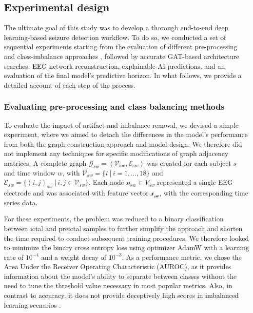 \documentclass[a4paper,fleqn]{cas-sc}
\begin{document}
\subsection{Experimental design}
\label{section:experiment_desing}
The ultimate goal of this study was to develop a thorough end-to-end deep learning-based seizure detection workflow. To do so, we conducted a set of sequential experiments starting from the evaluation of different pre-processing and class-imbalance approaches \cite{mazurek2023preprocessing}, followed by accurate GAT-based architecture searches, EEG network reconstruction, explainable AI predictions, and an evaluation of the final model's predictive horizon. In what follows, we provide a detailed account of each step of the process.

\subsubsection{Evaluating pre-processing and class balancing methods}
To evaluate the impact of artifact and imbalance removal, we devised a simple experiment, where we aimed to detach the differences in the model's performance from both the graph construction approach and model design. We therefore did not implement any techniques for specific modifications of graph adjacency matrices. A complete graph $\mathcal{G}_{sw} = (\mathcal{V}_{sw},\mathcal{E}_{sw})$ was created for each subject $s$ and time window $w$, with $\mathcal{V}_{sw} = \{i \ | \ i=1,\ldots,18\}$ and $\mathcal{E}_{sw} = \{(i,j)_{sw} \ | \ i,j \in \mathcal{V}_{sw}\}$. Each node $\mathcal{n}_{sw} \in V_{sw}$ represented a single EEG electrode and was associated with feature vector $\mathcal{x_{sw}}$, with the corresponding time series data. 

For these experiments, the problem was reduced to a binary classification between ictal and preictal samples to further simplify the approach and shorten the time required to conduct subsequent training procedures. We therefore looked to minimize the binary cross entropy loss using optimizer AdamW \cite{LoshchilovAdam} with a learning rate of $10^{-4}$ and a weight decay of $10^{-3}$. As a performance metric, we chose the Area Under the Receiver Operating Characteristic (AUROC), as it provides information about the model's ability to separate between classes without the need to tune the threshold value necessary in most popular metrics. Also, in contrast to accuracy, it does not provide deceptively high scores in imbalanced learning scenarios \cite{fawcett2006roc}. 
\end{document}
